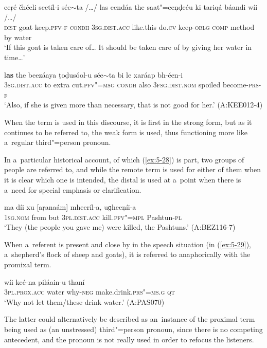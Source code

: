 \begin{exe}
\ex
\label{ex:5-27}
\gll eeṛé čhéeli seetíl-i sée$\sim$ta /{\ldots}/ las eendáa the saat"=eeṇḍeéu ki
tariqá báandi wíi /{\ldots}/ \\
\textsc{dist} goat keep.\textsc{pfv-f} \textsc{condh} {} \textsc{3sg}.\textsc{dist.acc} like.this do.\textsc{cv} keep-\textsc{oblg} \textsc{comp} method by water\\
\glt `If this goat is taken care of{\ldots} It should be taken care of by giving her water in time{\ldots}'

\gll l\textbf{as} the beezáaya ṭoḍusóol-u sée$\sim$ta bi le xaráap bh-éen-i \\
\textsc{3sg}.\textsc{dist.acc} to extra cut.\textsc{pfv"=msg} \textsc{condh} also
\textsc{3fsg}.\textsc{dist.nom} spoiled become-\textsc{prs-f} \\
\glt `Also, if she is given more than necessary, that is not good for her.' (A:KEE012-4)
\end{exe}
When the term is used in this discourse, it is first in the strong form, but as it continues to be referred to, the weak form is used, thus functioning more like a~regular third"=person pronoun.

In a~particular historical account, of which (\ref{ex:5-28}) is part, two groups of people are referred to, and while the remote term is used for either of them when it is clear which one is intended, the distal is used at a~point when there is a~need for special emphasis or clarification.

\begin{exe}
\ex
\label{ex:5-28}
\gll ma díi xu [aṛanaám] mheeríl-a, uɡheeṇíi-a\\
\textsc{1sg}.\textsc{nom} from but \textsc{3pl.}\textsc{dist.acc} kill.\textsc{pfv"=mpl} Pashtun-\textsc{pl}\\
\glt `They (the people you gave me) were killed, the Pashtuns.' (A:BEZ116-7)\\
\end{exe}
When a~referent is present and close by in the speech situation (in (\ref{ex:5-29}), a~shepherd's flock of sheep and goats), it is referred to anaphorically with the promixal term.

\begin{exe}
\ex
\label{ex:5-29}
\gll [aniaám] wíi keé-na piláain-u thaní \\
\textsc{3pl.prox.acc} water why-\textsc{neg} make.drink.\textsc{prs"=ms.g} \textsc{qt}\\
\glt `Why not let them/these drink water.' (A:PAS070)
\end{exe}
The latter could alternatively be described as an~instance of the proximal term being used as (an unstressed) third"=person pronoun, since there is no competing antecedent, and the pronoun is not really used in order to refocus the listeners.


